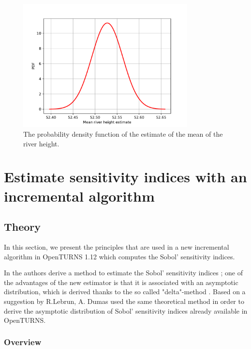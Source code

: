\documentclass{uncecomp2019}
\begin{document}
\begin{figure}
\centering
\includegraphics[width=0.8\textwidth]{figures/MeanSDistribution.pdf}
\caption{The probability density function of the estimate 
of the mean of the river height.}
\label{fig-variableMeanS}
\end{figure}


\section{Estimate sensitivity indices with an incremental algorithm}

\subsection{Theory}

In this section, we present the principles that are used in a new incremental 
algorithm in OpenTURNS 1.12 which computes the Sobol' sensitivity indices. 

In \cite{Janon2014} the authors derive a method to estimate the 
Sobol' sensitivity indices ; one of the advantages of the new 
estimator is that it is associated with an asymptotic distribution, 
which is derived thanks to the so called "delta"-method \cite{Vaart2000}. 
Based on a suggestion by R.Lebrun, A. Dumas \cite{RapportSobol2018} 
used the same theoretical method in order to derive the 
asymptotic distribution of Sobol' sensitivity indices already available 
in OpenTURNS. 


\subsubsection{Overview}
\end{document}
